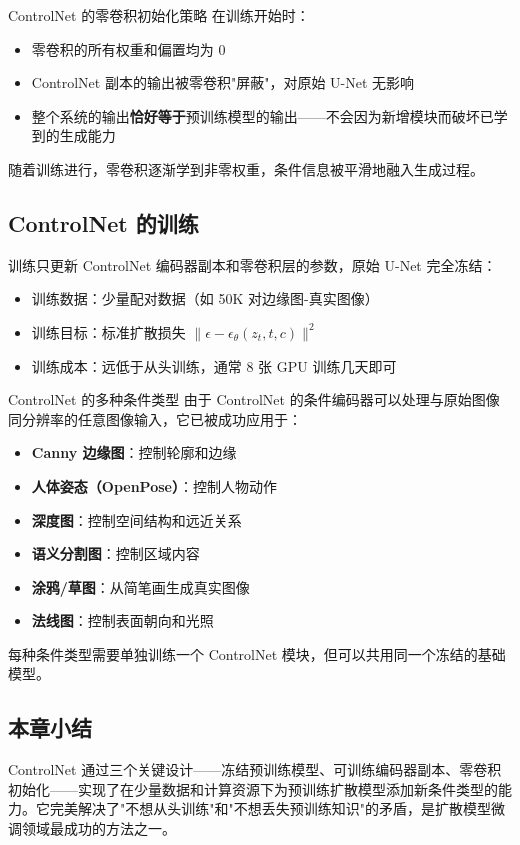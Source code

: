 \begin{importantbox}{ControlNet 的零卷积初始化策略}
在训练开始时：
\begin{itemize}
    \item 零卷积的所有权重和偏置均为 0
    \item ControlNet 副本的输出被零卷积"屏蔽"，对原始 U-Net 无影响
    \item 整个系统的输出\textbf{恰好等于}预训练模型的输出——不会因为新增模块而破坏已学到的生成能力
\end{itemize}
随着训练进行，零卷积逐渐学到非零权重，条件信息被平滑地融入生成过程。
\end{importantbox}

\subsection{ControlNet 的训练}

训练只更新 ControlNet 编码器副本和零卷积层的参数，原始 U-Net 完全冻结：

\begin{itemize}
    \item 训练数据：少量配对数据（如 50K 对边缘图-真实图像）
    \item 训练目标：标准扩散损失 $\|\epsilon - \epsilon_\theta(z_t, t, c)\|^2$
    \item 训练成本：远低于从头训练，通常 8 张 GPU 训练几天即可
\end{itemize}

\begin{knowledgebox}{ControlNet 的多种条件类型}
由于 ControlNet 的条件编码器可以处理与原始图像同分辨率的任意图像输入，它已被成功应用于：
\begin{itemize}
    \item \textbf{Canny 边缘图}：控制轮廓和边缘
    \item \textbf{人体姿态（OpenPose）}：控制人物动作
    \item \textbf{深度图}：控制空间结构和远近关系
    \item \textbf{语义分割图}：控制区域内容
    \item \textbf{涂鸦/草图}：从简笔画生成真实图像
    \item \textbf{法线图}：控制表面朝向和光照
\end{itemize}
每种条件类型需要单独训练一个 ControlNet 模块，但可以共用同一个冻结的基础模型。
\end{knowledgebox}

\subsection{本章小结}

ControlNet 通过三个关键设计——冻结预训练模型、可训练编码器副本、零卷积初始化——实现了在少量数据和计算资源下为预训练扩散模型添加新条件类型的能力。它完美解决了"不想从头训练"和"不想丢失预训练知识"的矛盾，是扩散模型微调领域最成功的方法之一。

\newpage
